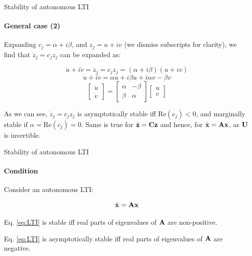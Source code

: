 \documentclass{beamer}
\begin{document}
\begin{frame}{Stability of autonomous LTI}
\framesubtitle{General case (2)}
\begin{flushleft}

Expanding $c_j = \alpha + i \beta$, and $z_j = u + i v$ (we dismiss subscripts for clarity), we find that $\dot{z}_j = c_j z_j$ can be expanded as:

\begin{equation}
    \dot{u} + i \dot{v} = \dot{z}_j = c_j z_j = (\alpha + i \beta) (u + i v)
\end{equation}
%
\begin{equation}
    \dot{u} + i \dot{v} = \alpha u + i \beta u + i \alpha v - \beta v
\end{equation}
%
\begin{equation}
\begin{bmatrix}
    \dot{u} \\ \dot{v}
\end{bmatrix}
     = 
\begin{bmatrix}
    \alpha & -\beta \\ \beta & \alpha
\end{bmatrix}     
\begin{bmatrix}
    u \\ v
\end{bmatrix}
\end{equation}

As we can see, $\dot{z}_j = c_j z_j$ is asymptotically stable iff $\text{Re}(c_j) < 0$, and marginally stable if $\alpha = \text{Re}(c_j) = 0$. Same is true for $\dot{\mathbf{z}} = \mathbf{C} \mathbf{z}$ and hence, for $\dot{\mathbf{x}} = \mathbf{A} \mathbf{x}$, as $\mathbf{U}$ is invertible.

\end{flushleft}
\end{frame}




\begin{frame}{Stability of autonomous LTI}
\framesubtitle{Condition}
\begin{flushleft}

Consider an autonomous LTI:

\begin{equation}
\label{eq:LTI}
    \dot{\mathbf{x}} = \mathbf{A} \mathbf{x}
\end{equation}

\begin{definition}
Eq. \eqref{eq:LTI} is stable iff real parts of eigenvalues of $\mathbf{A}$ are non-positive.
\end{definition}

\begin{definition}
Eq. \eqref{eq:LTI} is asymptotically stable iff real parts of eigenvalues of $\mathbf{A}$ are negative.
\end{definition}

\end{flushleft}
\end{frame}
\end{document}
